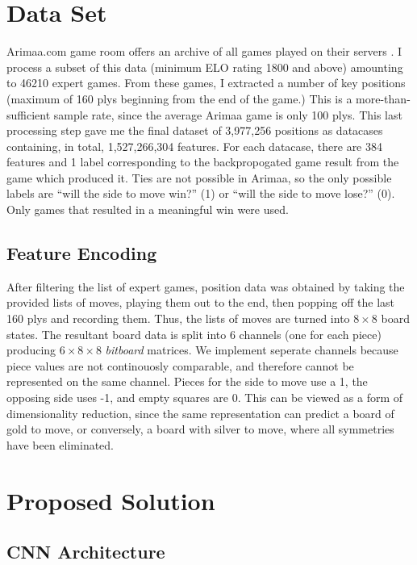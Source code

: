 \documentclass{article}
\begin{document}
\section{Data Set}
Arimaa.com game room offers an archive of all games played on their servers \cite{arimaa_com}\cite{games}.  I process a subset of this data (minimum ELO rating 1800 and above) amounting to 46210 expert games.  From these games, I extracted a number of key positions (maximum of 160 plys beginning from the end of the game.)  This is a more-than-sufficient sample rate, since the average Arimaa game is only 100 plys.  This last processing step gave me the final dataset of 3,977,256 positions as datacases containing, in total, 1,527,266,304 features.  For each datacase, there are 384 features and 1 label corresponding to the backpropogated game result from the game which produced it.  Ties are not possible in Arimaa, so the only possible labels are ``will the side to move win?'' (1) or ``will the side to move lose?'' (0).  Only games that resulted in a meaningful win were used.

\subsection{Feature Encoding}
After filtering the list of expert games, position data was obtained by taking the provided lists of moves, playing them out to the end, then popping off the last 160 plys and recording them.  Thus, the lists of moves are turned into  $8\times 8$ board states.  The resultant board data is split into 6 channels (one for each piece) producing $6\times 8\times 8$ \textit{bitboard} matrices.  We implement seperate channels because piece values are not continouosly comparable, and therefore cannot be represented on the same channel.  Pieces for the side to move use a 1, the opposing side uses -1, and empty squares are 0.  This can be viewed as a form of dimensionality reduction, since the same representation can predict a board of gold to move, or conversely, a board with silver to move, where all symmetries have been eliminated.

\section{Proposed Solution}

\subsection{CNN Architecture}
\end{document}
